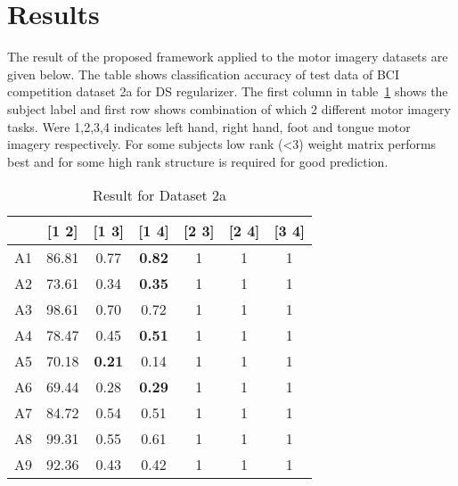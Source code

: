 \section{Results}
The result of the proposed framework applied to the motor imagery datasets are given below. The table shows classification accuracy of test data of BCI competition dataset 2a for DS regularizer. The first column in table~\ref{akb1} shows the subject label and first row shows combination of which 2 different motor imagery tasks. Were 1,2,3,4 indicates left hand, right hand, foot and tongue motor imagery respectively. For some subjects low rank (<3) weight matrix performs best and for some high rank structure is required for good prediction.

\begin{table}[hbtp]
\caption{Result for Dataset 2a}
\vspace{0.1 in}
\renewcommand{\arraystretch}{1.5}
\resizebox{12cm}{!} {
\begin{tabular}{|c|c|c|c|c|c|c|}
\hline 
 & [1 2] &[1 3] & [1 4]&[2 3]&[2 4]&[3 4] \\ 
\hline 
A1 & 86.81 & 0.77 & \textbf{0.82}&1&1&1 \\ 
\hline 
A2& 73.61 & 0.34 &\textbf{ 0.35}&1&1&1 \\ 
\hline 
A3 &98.61 & 0.70 & 0.72&1&1&1  \\ 
\hline 
A4 & 78.47 & 0.45 & \textbf{0.51}&1&1&1 \\ 
\hline 
A5 & 70.18 &\textbf{ 0.21} & 0.14&1&1&1 \\ 
\hline 
A6 & 69.44 & 0.28 & \textbf{0.29}&1&1&1  \\ 
\hline 
A7 &84.72 & 0.54 & 0.51&1&1&1 \\ 
\hline 
A8 &99.31 & 0.55 & 0.61&1&1&1  \\ 
\hline 
A9 &92.36 & 0.43 & 0.42&1&1&1 \\ 
\hline 
\end{tabular}  }
\label{akb1}
\end{table}

